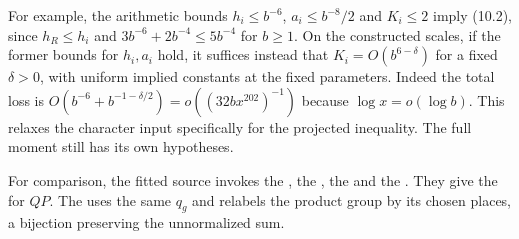 For example, the arithmetic bounds $h_i\le b^{-6}$, $a_i\le b^{-8}/2$
and $K_i\le2$ imply (10.2), since $h_R\le h_i$ and
$3b^{-6}+2b^{-4}\le5b^{-4}$ for $b\ge1$.
On the constructed scales, if the former bounds for $h_i,a_i$ hold, it
suffices instead that $K_i=O(b^{6-\delta})$ for a fixed $\delta>0$,
with uniform implied constants at the fixed parameters. Indeed the total
loss is $O(b^{-6}+b^{-1-\delta/2})=o((32b x^{202})^{-1})$ because
$\log x=o(\log b)$. This relaxes the character input specifically for
the projected inequality. The full moment still has its own hypotheses.

For comparison, the fitted source invokes the
,
the , the
 and the
.
They give the
for $QP$. The
uses the same $q_g$ and relabels the product group by its chosen places,
a bijection preserving the unnormalized sum.
